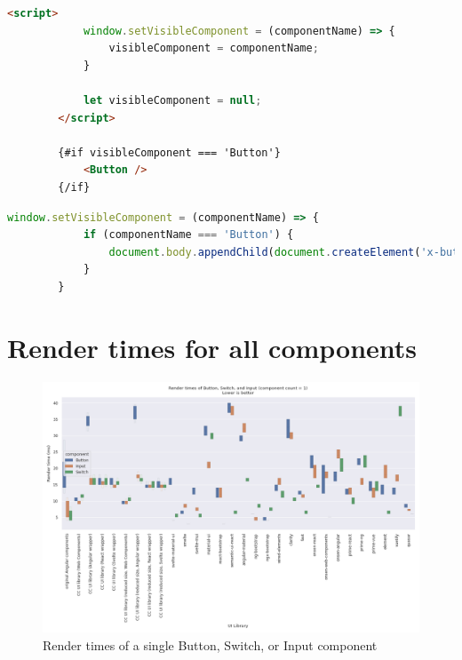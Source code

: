 		\begin{lstlisting}[language={HTML},caption={The render-on-demand function in Svelte},label={lst:appendix:svelte-set-visible}]
		<script>
			window.setVisibleComponent = (componentName) => {
				visibleComponent = componentName;
			}
		
			let visibleComponent = null;
		</script>
		
		{#if visibleComponent === 'Button'}
			<Button />
		{/if}
		\end{lstlisting}
		
		\begin{lstlisting}[language={JavaScript}, caption={The render-on-demand function in Web Components},label={lst:appendix:web-components-set-visible}]
		window.setVisibleComponent = (componentName) => {
			if (componentName === 'Button') {
				document.body.appendChild(document.createElement('x-button'));
			}
		}
		\end{lstlisting}

	\section{Render times for all components}

	\begin{figure}[h]
		\includegraphics[width=\columnwidth]{plots/render-time-all-big-1.png}
		\caption{Render times of a single Button, Switch, or Input component}
		\label{fig:appendix:render-time-cow-1}
		\centering
	\end{figure}


